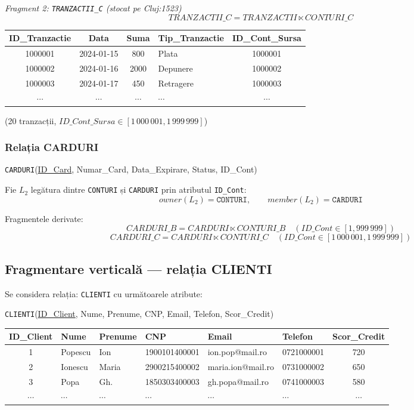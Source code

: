 \documentclass[12pt,a4paper]{article}
\begin{document}
\textit{Fragment 2: \texttt{TRANZACTII\_C} (stocat pe Cluj:1523)}
\[ TRANZACTII\_C = TRANZACTII \ltimes CONTURI\_C \]

\begin{center}
\small
\begin{tabular}{c|c|c|l|c}
\toprule
ID\_Tranzactie & Data & Suma & Tip\_Tranzactie & ID\_Cont\_Sursa \\
\midrule
1000001 & 2024-01-15 &  800 & Plata     & 1000001 \\
1000002 & 2024-01-16 & 2000 & Depunere  & 1000002 \\
1000003 & 2024-01-17 &  450 & Retragere & 1000003 \\
$\cdots$ & $\cdots$ & $\cdots$ & $\cdots$ & $\cdots$ \\
\bottomrule
\end{tabular}
\end{center}
(20 tranzacții, $ID\_Cont\_Sursa \in [1\,000\,001, 1\,999\,999]$)

\subsubsection*{Relația CARDURI}

\texttt{CARDURI}(\underline{ID\_Card}, Numar\_Card, Data\_Expirare, Status, ID\_Cont)

Fie $L_2$ legătura dintre \texttt{CONTURI} și \texttt{CARDURI} prin atributul \texttt{ID\_Cont}:
\[
  owner(L_2) = \texttt{CONTURI}, \qquad member(L_2) = \texttt{CARDURI}
\]

Fragmentele derivate:
\[
  CARDURI\_B = CARDURI \ltimes CONTURI\_B \quad (ID\_Cont \in [1, 999\,999])
\]
\[
  CARDURI\_C = CARDURI \ltimes CONTURI\_C \quad (ID\_Cont \in [1\,000\,001, 1\,999\,999])
\]

\subsection{Fragmentare verticală — relația CLIENTI}

Se considera relația: \texttt{CLIENTI} cu următoarele atribute:

\texttt{CLIENTI}(\underline{ID\_Client}, Nume, Prenume, CNP, Email, Telefon, Scor\_Credit)

\begin{center}
\small
\begin{tabular}{c|l|l|l|l|l|c}
\toprule
ID\_Client & Nume & Prenume & CNP & Email & Telefon & Scor\_Credit \\
\midrule
1 & Popescu & Ion   & 1900101400001 & ion.pop@mail.ro    & 0721000001 & 720 \\
2 & Ionescu & Maria & 2900215400002 & maria.ion@mail.ro  & 0731000002 & 650 \\
3 & Popa    & Gh.   & 1850303400003 & gh.popa@mail.ro    & 0741000003 & 580 \\
$\cdots$ & $\cdots$ & $\cdots$ & $\cdots$ & $\cdots$ & $\cdots$ & $\cdots$ \\
\bottomrule
\end{tabular}
\end{center}
\end{document}
